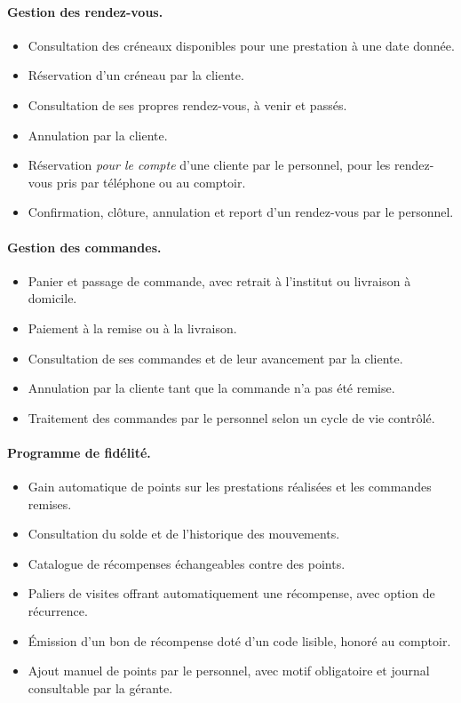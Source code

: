 \paragraph{Gestion des rendez-vous.}
\begin{itemize}[leftmargin=1.2cm,nosep]
  \item Consultation des créneaux disponibles pour une prestation à une date
  donnée.
  \item Réservation d'un créneau par la cliente.
  \item Consultation de ses propres rendez-vous, à venir et passés.
  \item Annulation par la cliente.
  \item Réservation \emph{pour le compte} d'une cliente par le personnel, pour
  les rendez-vous pris par téléphone ou au comptoir.
  \item Confirmation, clôture, annulation et report d'un rendez-vous par le
  personnel.
\end{itemize}

\paragraph{Gestion des commandes.}
\begin{itemize}[leftmargin=1.2cm,nosep]
  \item Panier et passage de commande, avec retrait à l'institut ou livraison à
  domicile.
  \item Paiement à la remise ou à la livraison.
  \item Consultation de ses commandes et de leur avancement par la cliente.
  \item Annulation par la cliente tant que la commande n'a pas été remise.
  \item Traitement des commandes par le personnel selon un cycle de vie
  contrôlé.
\end{itemize}

\paragraph{Programme de fidélité.}
\begin{itemize}[leftmargin=1.2cm,nosep]
  \item Gain automatique de points sur les prestations réalisées et les
  commandes remises.
  \item Consultation du solde et de l'historique des mouvements.
  \item Catalogue de récompenses échangeables contre des points.
  \item Paliers de visites offrant automatiquement une récompense, avec option
  de récurrence.
  \item Émission d'un bon de récompense doté d'un code lisible, honoré au
  comptoir.
  \item Ajout manuel de points par le personnel, avec motif obligatoire et
  journal consultable par la gérante.
\end{itemize}

